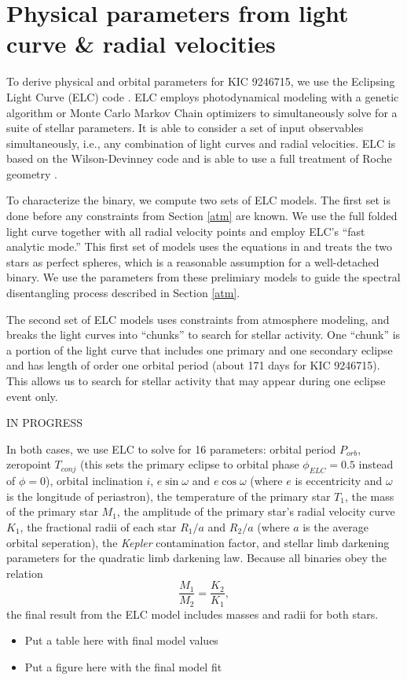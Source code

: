 \section{Physical parameters from light curve \& radial velocities}\label{model}
To derive physical and orbital parameters for KIC 9246715, we use the Eclipsing Light Curve (ELC) code \citep{oro00}. ELC employs photodynamical modeling with a genetic algorithm or Monte Carlo Markov Chain optimizers to simultaneously solve for a suite of stellar parameters. It is able to consider a set of input observables simultaneously, i.e., any combination of light curves and radial velocities. ELC is based on the Wilson-Devinney code \citep{wil71} and is able to use a full treatment of Roche geometry \citep{avn75}.

To characterize the binary, we compute two sets of ELC models. The first set is done before any constraints from Section \ref{atm} are known. We use the full folded light curve together with all radial velocity points and employ ELC's ``fast analytic mode.'' This first set of models uses the equations in \citet{gim06} and treats the two stars as perfect spheres, which is a reasonable assumption for a well-detached binary. We use the parameters from these prelimiary models to guide the spectral disentangling process described in Section \ref{atm}.

The second set of ELC models uses constraints from atmosphere modeling, and breaks the light curves into ``chunks'' to search for stellar activity. One ``chunk'' is a portion of the light curve that includes one primary and one secondary eclipse and has length of order one orbital period (about 171 days for KIC 9246715). This allows us to search for stellar activity that may appear during one eclipse event only.

IN PROGRESS

In both cases, we use ELC to solve for 16 parameters: orbital period $P_{orb}$, zeropoint $T_{conj}$ (this sets the primary eclipse to orbital phase $\phi_{ELC} = 0.5$ instead of $\phi = 0$), orbital inclination $i$, $e \sin \omega$ and $e \cos \omega$ (where $e$ is eccentricity and $\omega$ is the longitude of periastron), the temperature of the primary star $T_1$, the mass of the primary star $M_1$, the amplitude of the primary star's radial velocity curve $K_1$, the fractional radii of each star $R_1/a$ and $R_2/a$ (where $a$ is the average orbital seperation), the \emph{Kepler} contamination factor, and stellar limb darkening parameters for the quadratic limb darkening law. Because all binaries obey the relation
\begin{equation}
\frac{M_1}{M_2} = \frac{K_2}{K_1},
\end{equation}
the final result from the ELC model includes masses and radii for both stars.

\begin{itemize}
\item Put a table here with final model values
\item Put a figure here with the final model fit
\end{itemize}
